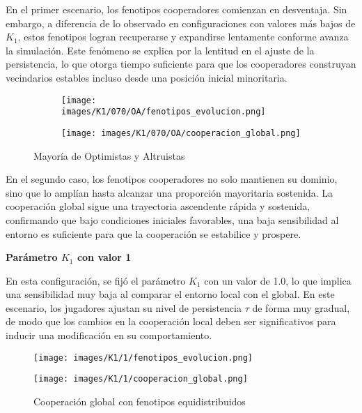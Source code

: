 \documentclass[a4paper,12pt]{report}
\begin{document}
En el primer escenario, los fenotipos cooperadores comienzan en desventaja. Sin embargo, a diferencia de lo observado en configuraciones con valores más bajos de \( K_1 \), estos fenotipos logran recuperarse y expandirse lentamente conforme avanza la simulación. Este fenómeno se explica por la lentitud en el ajuste de la persistencia, lo que otorga tiempo suficiente para que los cooperadores construyan vecindarios estables incluso desde una posición inicial minoritaria.



\begin{figure}[h]
    \centering
    \begin{subfigure}[t]{0.49\textwidth}
        \centering
        \texttt{[image: images/K1/070/OA/fenotipos\_evolucion.png]}
        \label{fig:enter-label}
    \end{subfigure}
    \hfill
    \begin{subfigure}[t]{0.49\textwidth}
        \centering
        \texttt{[image: images/K1/070/OA/cooperacion\_global.png]}
        \label{fig:enter-label}
    \end{subfigure}
    \caption{Mayoría de Optimistas y Altruistas}
\end{figure}

En el segundo caso, los fenotipos cooperadores no solo mantienen su dominio, sino que lo amplían hasta alcanzar una proporción mayoritaria sostenida. La cooperación global sigue una trayectoria ascendente rápida y sostenida, confirmando que bajo condiciones iniciales favorables, una baja sensibilidad al entorno es suficiente para que la cooperación se estabilice y prospere.

\newpage

\vspace{1.5em}
\noindent\textbf{Parámetro \( K_1 \) con valor 1}
\vspace{0.5em}

En esta configuración, se fijó el parámetro \( K_1 \) con un valor de 1.0, lo que implica una sensibilidad muy baja al comparar el entorno local con el global. En este escenario, los jugadores ajustan su nivel de persistencia \( \tau \) de forma muy gradual, de modo que los cambios en la cooperación local deben ser significativos para inducir una modificación en su comportamiento.

\begin{figure}[h!]
    \centering
    \begin{minipage}{0.49\textwidth}
    \centering
    \texttt{[image: images/K1/1/fenotipos\_evolucion.png]}
    \label{fig:enter-label}
    \end{minipage}
    \hfill
    \begin{minipage}{0.49\textwidth}
    \centering
    \texttt{[image: images/K1/1/cooperacion\_global.png]}
    \label{fig:enter-label}
    \end{minipage}
    \caption{Cooperación global con fenotipos equidistribuidos}
\end{figure}
\end{document}
